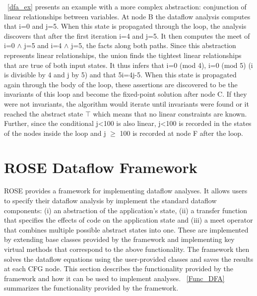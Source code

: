 ~\ref{dfa_ex} presents an example with a more complex abstraction: conjunction of linear relationships between variables. At node B the dataflow analysis computes that i=0 and j=5. When this state is propagated through the loop, the analysis discovers that after the first iteration i=4 and j=5. It then computes the meet of i=0 $\wedge$ j=5 and i=4 $\wedge$ j=5, the facts along both paths. Since this abstraction represents linear relationships, the union finds the tightest linear relationships that are true of both input states. It thus infers that i=0 (mod 4), i=0 (mod 5) (i is divisible by 4 and j by 5) and that 5i=4j-5. When this state is propagated again through the body of the loop, these assertions are discovered to be the invariants of this loop and become the fixed-point solution after node C. If they were not invariants, the algorithm would iterate until invariants were found or it reached the abstract state $\top$ which means that no linear constraints are known. Further, since the conditional j\textless100 is also linear, j\textless100 is recorded in the states of the nodes inside the loop and j $\ge$ 100 is recorded at node F after the loop.

\section{ROSE Dataflow Framework}
\label{ROSE_dfa}
ROSE provides a framework for implementing dataflow analyses. It allows users to specify their dataflow analysis by implement the standard dataflow components: (i) an abstraction of the application’s state, (ii) a transfer function that specifies the effects of code on the application state and (iii) a meet operator that combines multiple possible abstract states into one. These are implemented by extending base classes provided by the framework and implementing key virtual methods that correspond to the above functionality. The framework then solves the dataflow equations using the user-provided classes and saves the results at each CFG node. This section describes the functionality provided by the framework and how it can be used to implement analyses. ~\ref{Func_DFA} summarizes the functionality provided by the framework.

